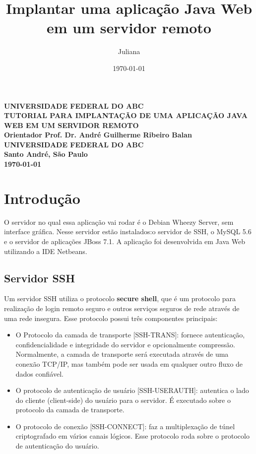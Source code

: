 \documentclass[11pt,a4paper]{report}
\title{Implantar uma aplicação Java Web em um servidor remoto}
\author{Juliana}
\date{\today}
\begin{document}
\begin{titlepage}
\centering

\textbf{UNIVERSIDADE FEDERAL DO ABC\\\vspace{4.5cm}
TUTORIAL PARA IMPLANTAÇÃO DE UMA APLICAÇÃO JAVA WEB EM UM SERVIDOR REMOTO\\\vspace{3.5cm}
Orientador Prof. Dr. André Guilherme Ribeiro Balan\\\vspace{6cm}
UNIVERSIDADE FEDERAL DO ABC\\\vspace{2cm}
Santo André, São Paulo\\\today
}
\end{titlepage}
\onehalfspacing


\tableofcontents


\newpage

\chapter{Introdução}

O servidor no qual essa aplicação vai rodar é o Debian Wheezy Server, sem interface gráfica. Nesse servidor estão instalados:o servidor de SSH, o MySQL 5.6 e o servidor de aplicações JBoss 7.1. A aplicação foi desenvolvida em Java Web utilizando a IDE Netbeans.

\section{Servidor SSH}

Um servidor SSH utiliza o protocolo \textbf{secure shell}, que é um protocolo para realização de login remoto seguro e outros serviços seguros de rede através de uma rede insegura.  \cite{ylonen2006secure} Esse protocolo possui três componentes principais:

\begin{itemize}
\item O Protocolo da camada de transporte [SSH-TRANS]: fornece autenticação, confidencialidade e integridade do servidor e opcionalmente compressão. Normalmente, a camada de transporte será executada através de uma conexão TCP/IP, mas também pode ser usada em qualquer outro fluxo de dados confiável. 
\item O protocolo de autenticação de usuário [SSH-USERAUTH]: autentica o lado do cliente (client-side) do usuário para o servidor. É executado sobre o protocolo da camada de transporte.
\item O protocolo de conexão [SSH-CONNECT]: faz a multiplexação de túnel criptografado em vários canais lógicos. Esse protocolo roda sobre o protocolo de autenticação do usuário.
\end{itemize}
\end{document}
